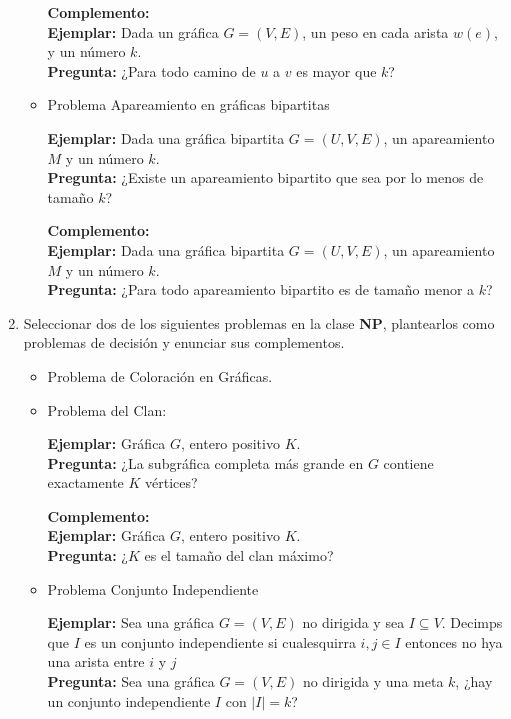 \documentclass[11pt,letterpaper]{report}
\begin{document}
\begin{enumerate}
\begin{itemize}
    \medskip
    \textbf{Complemento:}\\
    \textbf{Ejemplar:} Dada un gráfica $G=(V,E)$, un peso en cada arista $w(e)$, y un número $k$.\\
    \textbf{Pregunta:} ¿Para todo camino de $u$ a $v$ es mayor que $k$?

    \item Problema Apareamiento en gráficas bipartitas
    
    \textbf{Ejemplar:} Dada una gráfica bipartita $G = (U,V,E)$, un apareamiento $M$ y un número $k$.\\
    \textbf{Pregunta:} ¿Existe un apareamiento bipartito que sea por lo menos de tamaño $k$?

    \medskip
    \textbf{Complemento:}\\
    \textbf{Ejemplar:} Dada una gráfica bipartita $G = (U,V,E)$, un apareamiento $M$ y un número $k$.\\
    \textbf{Pregunta:} ¿Para todo apareamiento bipartito es de tamaño menor a $k$?
\end{itemize}



\item Seleccionar dos de los siguientes problemas en la clase \textbf{NP}, plantearlos como
problemas de decisión y enunciar sus complementos.
\begin{itemize}
    \item Problema de Coloración en Gráficas.
    

    \item Problema del Clan:
    
    \textbf{Ejemplar:} Gráfica $G$, entero positivo $K$.\\
    \textbf{Pregunta:} ¿La subgráfica completa más grande en $G$ contiene exactamente 
    $K$ vértices?

    \medskip
    \textbf{Complemento:}\\
    \textbf{Ejemplar:} Gráfica $G$, entero positivo $K$.\\
    \textbf{Pregunta:} ¿$K$ es el tamaño del clan máximo?
    

    \item Problema Conjunto Independiente
    
    \textbf{Ejemplar:} Sea una gráfica $G=(V,E)$ no dirigida y sea $I \subseteq V$. Decimps que $I$
    es un conjunto independiente si cualesquirra $i,j \in I$ entonces no hya una arista entre $i$ y
    $j$\\
    \textbf{Pregunta:} Sea una gráfica $G=(V,E)$ no dirigida y una meta $k$, ¿hay un
    conjunto independiente $I$ con $|I| = k$?


\end{itemize}
\end{enumerate}
\end{document}
